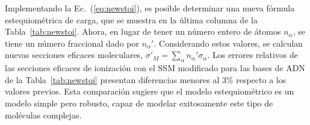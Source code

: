 Implementando la Ec.~(\ref{eq:newstoi}), es posible determinar una nueva 
fórmula estequiométrica de carga, que se muestra en la última columna de 
la Tabla~\ref{tab:newstoi}. Ahora, en lugar de tener un número entero 
de átomos $n_{\alpha}$, se tiene un número fraccional dado por 
$n_{\alpha}'$. Considerando estos valores, se calculan nuevas secciones 
eficaces moleculares, 
$\sigma'_{M}=\sum_{\alpha}n_{\alpha}'\sigma_{\alpha}$. Los errores 
relativos de las secciones eficaces de ionización con el SSM modificado 
para las bases de ADN de la Tabla~\ref{tab:newstoi} presentan 
diferencias menores al 3\% respecto a los valores previos. Esta 
comparación sugiere que el modelo estequiométrico es un modelo simple 
pero robusto, capaz de modelar exitosamente este tipo de moléculas 
complejas.


